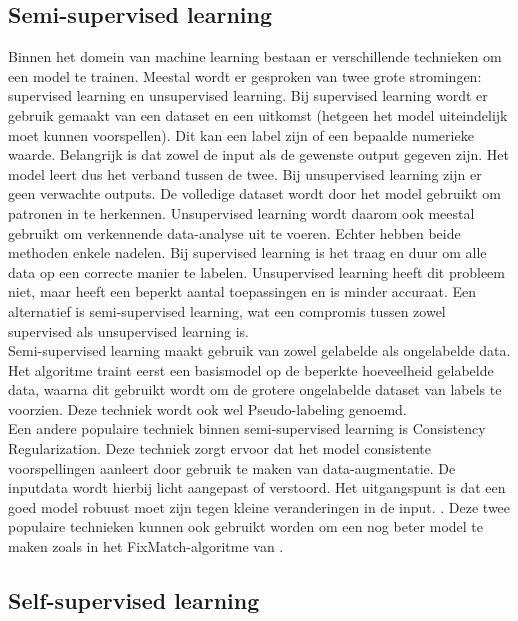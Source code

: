 \subsection{Semi-supervised learning}

Binnen het domein van machine learning bestaan er verschillende technieken om een model te trainen. Meestal wordt er gesproken van twee grote stromingen: supervised learning en unsupervised learning. Bij supervised learning wordt er gebruik gemaakt van een dataset en een uitkomst (hetgeen het model uiteindelijk moet kunnen voorspellen). Dit kan een label zijn of een bepaalde numerieke waarde. Belangrijk is dat zowel de input als de gewenste output gegeven zijn. Het model leert dus het verband tussen de twee. Bij unsupervised learning zijn er geen verwachte outputs. De volledige dataset wordt door het model gebruikt om patronen in te herkennen. Unsupervised learning wordt daarom ook meestal gebruikt om verkennende data-analyse uit te voeren. Echter hebben beide methoden enkele nadelen. Bij supervised learning is het traag en duur om alle data op een correcte manier te labelen. Unsupervised learning heeft dit probleem niet, maar heeft een beperkt aantal toepassingen en is minder accuraat. Een alternatief is semi-supervised learning, wat een compromis tussen zowel supervised als unsupervised learning is. \autocite{C_A_Padmanabha_Reddy_2018} \\

Semi-supervised learning maakt gebruik van zowel gelabelde als ongelabelde data. Het algoritme traint eerst een basismodel op de beperkte hoeveelheid gelabelde data, waarna dit gebruikt wordt om de grotere ongelabelde dataset van labels te voorzien. Deze techniek wordt ook wel Pseudo-labeling genoemd. \autocite{Lee_2013} \\

Een andere populaire techniek binnen semi-supervised learning is Consistency Regularization. Deze techniek zorgt ervoor dat het model consistente voorspellingen aanleert door gebruik te maken van data-augmentatie. De inputdata wordt hierbij licht aangepast of verstoord. Het uitgangspunt is dat een goed model robuust moet zijn tegen kleine veranderingen in de input. \autocite{Fan_2022}. Deze twee populaire technieken kunnen ook gebruikt worden om een nog beter model te maken zoals in het FixMatch-algoritme van \textcite{Sohn_2020}.

\subsection{Self-supervised learning}

